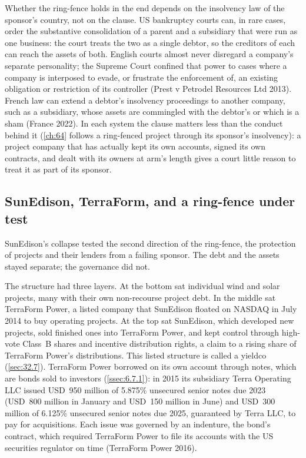 Whether the ring-fence holds in the end depends on the insolvency law of the sponsor's country, not on the clause. US bankruptcy courts can, in rare cases, order the substantive consolidation of a parent and a subsidiary that were run as one business: the court treats the two as a single debtor, so the creditors of each can reach the assets of both. English courts almost never disregard a company's separate personality; the Supreme Court confined that power to cases where a company is interposed to evade, or frustrate the enforcement of, an existing obligation or restriction of its controller (Prest v Petrodel Resources Ltd 2013). French law can extend a debtor's insolvency proceedings to another company, such as a subsidiary, whose assets are commingled with the debtor's or which is a sham (France 2022). In each system the clause matters less than the conduct behind it (\cref{ch:64} follows a ring-fenced project through its sponsor's insolvency): a project company that has actually kept its own accounts, signed its own contracts, and dealt with its owners at arm's length gives a court little reason to treat it as part of its sponsor.

\subsection{SunEdison, TerraForm, and a ring-fence under test}\label{ssec:2.1.3}

SunEdison's collapse tested the second direction of the ring-fence, the protection of projects and their lenders from a failing sponsor. The debt and the assets stayed separate; the governance did not.

The structure had three layers. At the bottom sat individual wind and solar projects, many with their own non-recourse project debt. In the middle sat TerraForm Power, a listed company that SunEdison floated on NASDAQ in July 2014 to buy operating projects. At the top sat SunEdison, which developed new projects, sold finished ones into TerraForm Power, and kept control through high-vote Class~B shares and incentive distribution rights, a claim to a rising share of TerraForm Power's distributions. This listed structure is called a yieldco (\cref{sec:32.7}). TerraForm Power borrowed on its own account through notes, which are bonds sold to investors (\cref{ssec:6.7.1}): in 2015 its subsidiary Terra Operating LLC issued USD~950 million of 5.875\% unsecured senior notes due 2023 (USD~800 million in January and USD~150 million in June) and USD~300 million of 6.125\% unsecured senior notes due 2025, guaranteed by Terra LLC, to pay for acquisitions. Each issue was governed by an indenture, the bond's contract, which required TerraForm Power to file its accounts with the US securities regulator on time (TerraForm Power 2016).


